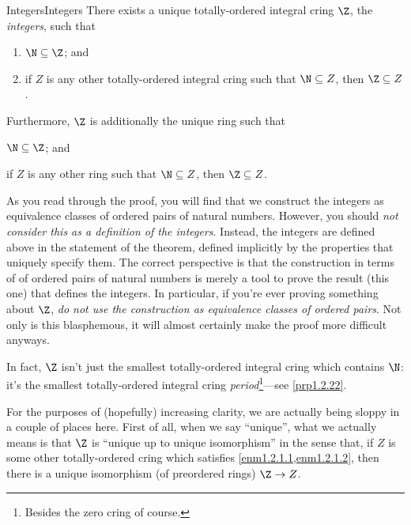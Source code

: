 \begin{thm}{Integers}{Integers}
There exists a unique totally-ordered integral cring $\Z$\index[notation]{$\Z$}, the \emph{integers}, such that
\begin{enumerate}
\item \label{enm1.2.1.1}$\N \subseteq \Z$; and
\item \label{enm1.2.1.2}if $Z$ is any other totally-ordered integral cring such that $\N \subseteq Z$, then $\Z \subseteq Z$.
\end{enumerate}

Furthermore, $\Z$ is additionally the unique ring such that
\begin{enumerateprime}
\item \label{Integers.i}$\N \subseteq \Z$; and
\item \label{Integers.ii}if $Z$ is any other ring such that $\N \subseteq Z$, then $\Z \subseteq Z$.
\end{enumerateprime}
\begin{rmk}
As you read through the proof, you will find that we construct the integers as equivalence classes of ordered pairs of natural numbers.  However, you should \emph{not consider this as a definition of the integers}.  Instead, the integers are defined above in the statement of the theorem, defined implicitly by the properties that uniquely specify them.  The correct perspective is that the construction in terms of of ordered pairs of natural numbers is merely a tool to prove the result (this one) that defines the integers.  In particular, if you're ever proving something about $\Z$, \emph{do not use the construction as equivalence classes of ordered pairs}.  Not only is this blasphemous, it will almost certainly make the proof more difficult anyways.
\end{rmk}
\begin{rmk}
In fact, $\Z$ isn't just the smallest totally-ordered integral cring which contains $\N$:  it's the smallest totally-ordered integral cring \emph{period}\footnote{Besides the zero cring of course.}---see \cref{prp1.2.22}.
\end{rmk}
\begin{rmk}
For the purposes of (hopefully) increasing clarity, we are actually being sloppy in a couple of places here.  First of all, when we say ``unique'', what we actually means is that $\Z$ is ``unique up to unique isomorphism'' in the sense that, if $Z$ is some other totally-ordered cring which satisfies \cref{enm1.2.1.1,enm1.2.1.2}, then there is a unique isomorphism (of preordered rings) $\Z \rightarrow Z$.


\end{rmk}
\end{thm}
